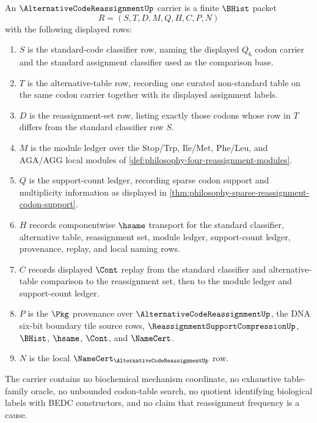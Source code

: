 \begin{definition}
\label{def:alternative-code-reassignment-carrier}
An $\AlternativeCodeReassignmentUp$ carrier is a finite $\BHist$ packet
$$
R=(S,T,D,M,Q,H,C,P,N)
$$
with the following displayed rows:
\begin{enumerate}
\item $S$ is the standard-code classifier row, naming the displayed $Q_{6}$ codon carrier and the standard assignment classifier used as the comparison base.
\item $T$ is the alternative-table row, recording one curated non-standard table on the same codon carrier together with its displayed assignment labels.
\item $D$ is the reassignment-set row, listing exactly those codons whose row in $T$ differs from the standard classifier row $S$.
\item $M$ is the module ledger over the Stop/Trp, Ile/Met, Phe/Leu, and AGA/AGG local modules of \autoref{def:philosophy-four-reassignment-modules}.
\item $Q$ is the support-count ledger, recording sparse codon support and multiplicity information as displayed in \autoref{thm:philosophy-sparse-reassignment-codon-support}.
\item $H$ records componentwise $\hsame$ transport for the standard classifier, alternative table, reassignment set, module ledger, support-count ledger, provenance, replay, and local naming rows.
\item $C$ records displayed $\Cont$ replay from the standard classifier and alternative-table comparison to the reassignment set, then to the module ledger and support-count ledger.
\item $P$ is the $\Pkg$ provenance over $\AlternativeCodeReassignmentUp$, the DNA six-bit boundary tile source rows, $\ReassignmentSupportCompressionUp$, $\BHist$, $\hsame$, $\Cont$, and $\NameCert$.
\item $N$ is the local $\NameCert_{\AlternativeCodeReassignmentUp}$ row.
\end{enumerate}
The carrier contains no biochemical mechanism coordinate, no exhaustive table-family oracle, no unbounded codon-table search, no quotient identifying biological labels with BEDC constructors, and no claim that reassignment frequency is a cause.
\end{definition}


